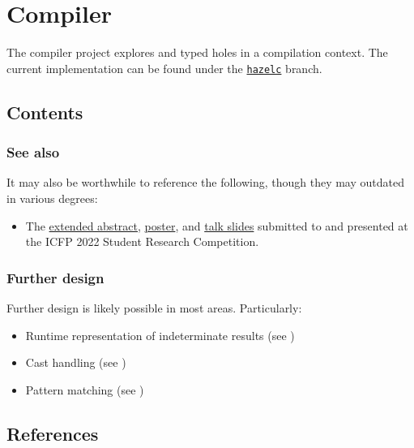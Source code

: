 \documentclass{article}
\begin{document}
\setcounter{section}{13}
\section{Compiler}
The compiler project explores \Hazel{} and typed holes in a compilation context. The current
implementation can be found under the
\href{https://github.com/hazelgrove/hazel/tree/hazelc}{\texttt{hazelc}} branch. 

\subsection{Contents}
\tableofcontents

\subsubsection{See also}
\label{sec:see-also}
It may also be worthwhile to reference the following, though they may outdated in various degrees:
%
\begin{itemize}
  \item The \href{https://github.com/hazelgrove/hazelc-icfp22-src}{extended abstract},
    \href{https://github.com/mirryi/hazelc-icfp22-poster}{poster}, and
    \href{https://github.com/mirryi/hazelc-icfp22-slides}{talk slides} submitted to and presented at
    the ICFP 2022 Student Research Competition.
\end{itemize}

\subsubsection{Further design}
\label{sec:further-design}
Further design is likely possible in most areas. Particularly:
\begin{itemize}
  \item Runtime representation of indeterminate results (see )
  \item Cast handling (see )
  \item Pattern matching (see )
\end{itemize}






\subsection{References}
\printbibliography[heading=none]
\end{document}
